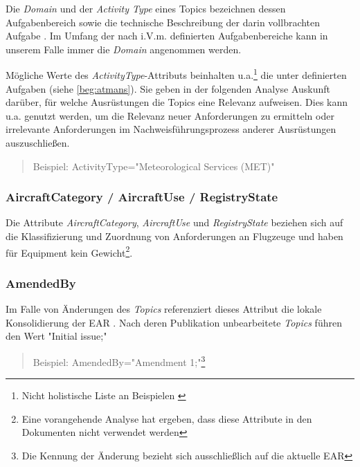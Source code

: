     Die \textit{Domain} und der \textit{Activity Type} eines Topics bezeichnen dessen Aufgabenbereich sowie die technische Beschreibung der darin vollbrachten Aufgabe \cite[S. 18]{easa_xml_doc}.
    Im Umfang der nach  i.V.m.  definierten Aufgabenbereiche kann in unserem Falle immer die \textit{Domain} \atmans angenommen werden.
    
    Mögliche Werte des \textit{ActivityType}-Attributs beinhalten u.a.\footnote{Nicht holistische Liste an Beispielen \cite[vgl.][S.18 -- 19]{easa_xml_doc}} die unter \atmans{} definierten Aufgaben (siehe \ref{beg:atmans}).
    Sie geben in der folgenden Analyse Auskunft darüber, für welche \atmans Ausrüstungen die Topics eine Relevanz aufweisen.
    Dies kann u.a. genutzt werden, um die Relevanz neuer Anforderungen zu ermitteln oder irrelevante Anforderungen im Nachweisführungsprozess anderer Ausrüstungen auszuschließen.  
    
    \begin{quote}
        Beispiel:
        \textsf{ActivityType="Meteorological Services (MET)"}
    \end{quote}
   
\subsubsection{AircraftCategory / AircraftUse / RegistryState}
    
    Die Attribute \textit{AircraftCategory}, \textit{AircraftUse} und \textit{RegistryState} beziehen sich auf die Klassifizierung und Zuordnung von Anforderungen an Flugzeuge und haben für \atmans{} Equipment kein Gewicht\footnote{Eine vorangehende Analyse hat ergeben, dass diese Attribute in den \atmans Dokumenten nicht verwendet werden}. \cite[20, 21, 26]{easa_xml_doc}
    
\subsubsection{AmendedBy}

    Im Falle von Änderungen des \textit{Topics} referenziert dieses Attribut die lokale Konsolidierung der \ac{EAR}
    \cite[21]{easa_xml_doc}.
    Nach deren Publikation unbearbeitete \textit{Topics} führen den Wert \textsf{"{}Initial issue;"}
    
    \begin{quote}
        Beispiel:
        \textsf{AmendedBy="{}Amendment 1;"}\footnote{Die Kennung der Änderung bezieht sich ausschließlich auf die aktuelle \ac{EAR}}
    \end{quote}
    
